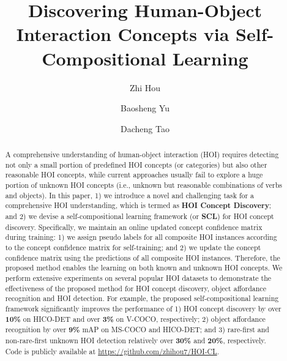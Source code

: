 \documentclass[runningheads]{llncs}
\begin{document}
\pagestyle{headings}
\mainmatter
\def\ECCVSubNumber{3593}  

\title{Discovering Human-Object Interaction Concepts via Self-Compositional Learning} 

\begin{comment}
\titlerunning{ECCV-22 submission ID \ECCVSubNumber}
\authorrunning{ECCV-22 submission ID \ECCVSubNumber}
\author{Anonymous ECCV submission}
\institute{Paper ID \ECCVSubNumber}
\end{comment}


\author{Zhi Hou \and
Baosheng Yu \and
Dacheng Tao}





\maketitle
\begin{abstract}
A comprehensive understanding of human-object interaction (HOI) requires detecting not only a small portion of predefined HOI concepts (or categories) but also other reasonable HOI concepts, while current approaches usually fail to explore a huge portion of unknown HOI concepts (i.e., unknown but reasonable combinations of verbs and objects). In this paper, 1) we introduce a novel and challenging task for a comprehensive HOI understanding, which is termed as \textbf{HOI Concept Discovery}; and 2) we devise a self-compositional learning framework (or \textbf{SCL}) for HOI concept discovery. Specifically, we maintain an online updated concept confidence matrix during training: 1) we assign pseudo labels for all composite HOI instances according to the concept confidence matrix for self-training; and 2) we update the concept confidence matrix using the predictions of all composite HOI instances. Therefore, the proposed method enables the learning on both known and unknown HOI concepts. We perform extensive experiments on several popular HOI datasets to demonstrate the effectiveness of the proposed method for HOI concept discovery, object affordance recognition and HOI detection. For example, the proposed self-compositional learning framework significantly improves the performance of 1) HOI concept discovery by over \textbf{10\%} on HICO-DET and over \textbf{3\%} on V-COCO, respectively; 2) object affordance recognition by over \textbf{9\%} mAP on MS-COCO and HICO-DET; and 3) rare-first and non-rare-first unknown HOI detection relatively over \textbf{30\%} and \textbf{20\%}, respectively. Code is publicly available at \url{https://github.com/zhihou7/HOI-CL}.


\end{abstract}
\end{document}
